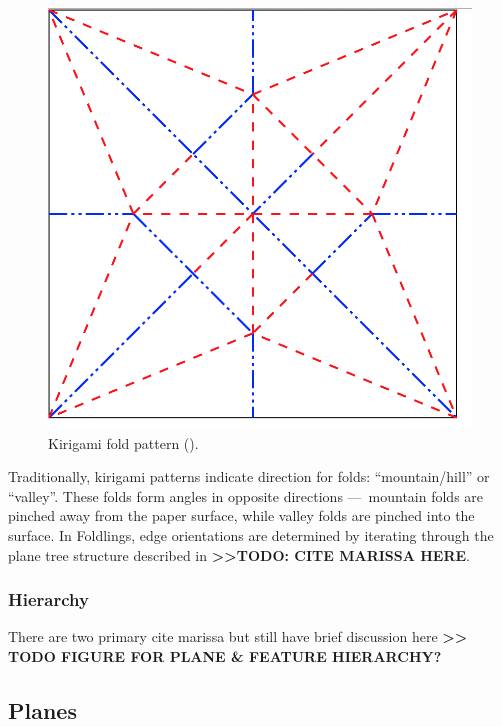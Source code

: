 \begin{figure}[htbp]
\centering
\includegraphics{figures/33_UI_Interface_Data_Structures/maekawas-theorem.png}
\caption{Kirigami fold pattern (\citet{maekawas-theorem}).}
\end{figure}

Traditionally, kirigami patterns indicate direction for folds:
``mountain/hill'' or ``valley''. These folds form angles in opposite
directions ---~mountain folds are pinched away from the paper surface,
while valley folds are pinched into the surface. In Foldlings, edge
orientations are determined by iterating through the plane tree
structure described in \textbf{\textgreater{}\textgreater{}TODO: CITE
MARISSA HERE}.

\subsubsection{Hierarchy}\label{hierarchy}

There are two primary cite marissa but still have brief discussion here
\textbf{\textgreater{}\textgreater{} TODO FIGURE FOR PLANE \& FEATURE
HIERARCHY?}

\subsection{Planes}\label{planes}

